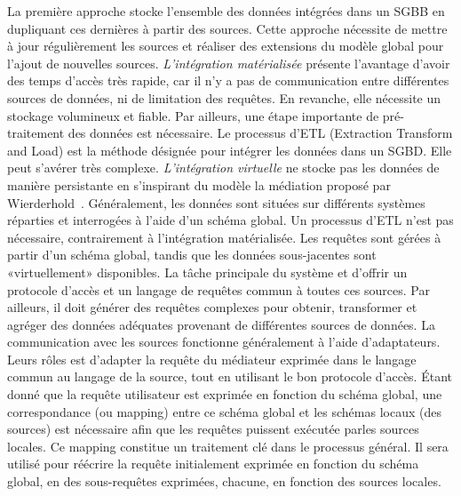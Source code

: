 La première approche stocke l'ensemble des données intégrées dans un SGBB en dupliquant ces dernières à partir des sources. Cette approche nécessite de mettre à jour régulièrement les sources et réaliser des extensions du modèle global pour l'ajout de nouvelles sources. \textit{L'intégration matérialisée} présente l'avantage d'avoir des temps d'accès très rapide, car il n'y a pas de communication entre différentes sources de données, ni de limitation des requêtes. En revanche, elle nécessite un stockage volumineux et fiable. Par ailleurs, une étape importante de pré-traitement des données est nécessaire. Le processus d'ETL (Extraction Transform and Load) est la méthode désignée pour intégrer les données dans un SGBD. Elle peut s'avérer très complexe. \textit{L'intégration virtuelle} ne stocke pas les données de manière persistante en s'inspirant du modèle la médiation proposé par Wierderhold~\cite{Wiederhold1995,wiederhold1997}. Généralement, les données sont situées sur différents systèmes réparties et interrogées à l'aide d'un schéma global. Un processus d'ETL n'est pas nécessaire, contrairement à l'intégration matérialisée. Les requêtes sont gérées à partir d'un schéma global, tandis que les données sous-jacentes sont «virtuellement» disponibles. La tâche principale du système et d'offrir un protocole d’accès et un langage de requêtes commun à toutes ces sources. Par ailleurs, il doit générer des requêtes complexes pour obtenir, transformer et agréger des données adéquates provenant de différentes sources de données. La communication avec les sources fonctionne généralement à l'aide d'adaptateurs. Leurs rôles est d'adapter la requête du médiateur exprimée dans le langage commun au langage de la source, tout en utilisant le bon protocole d’accès. Étant donné que la requête utilisateur est exprimée en fonction du schéma global, une correspondance (ou mapping) entre ce schéma global et les schémas locaux (des sources) est nécessaire  afin que les requêtes puissent exécutée parles sources locales.  Ce mapping constitue un traitement clé dans le processus général. Il sera utilisé pour réécrire la requête initialement exprimée en fonction du schéma global, en des sous-requêtes exprimées, chacune, en fonction des sources locales.\\

